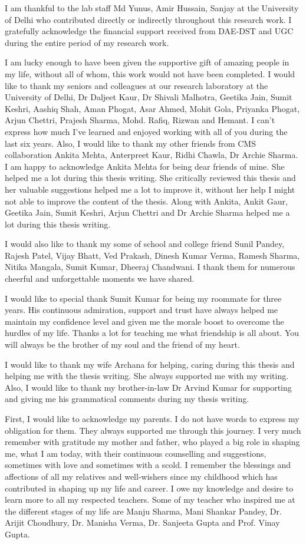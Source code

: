 I am thankful to the lab staff Md Yunus, Amir Hussain, Sanjay at the University of Delhi who contributed directly or indirectly throughout this research work. I gratefully acknowledge the financial support received from DAE-DST and UGC during the entire period of my research work.

I am lucky enough to have been given the supportive gift of amazing people in my life, without all of whom, this work would not have been completed. I would like to thank my seniors and colleagues at our research laboratory at the University of Delhi, Dr Daljeet Kaur, Dr Shivali Malhotra, Geetika Jain, Sumit Keshri, Aashiq Shah, Aman Phogat, Asar Ahmed, Mohit Gola, Priyanka Phogat, Arjun Chettri, Prajesh Sharma, Mohd. Rafiq, Rizwan and Hemant. I can’t express how much I’ve learned and enjoyed working with all of you during the last six years. Also, I would like to thank my other friends from CMS collaboration Ankita Mehta, Anterpreet Kaur, Ridhi Chawla, Dr Archie Sharma.
I am happy to acknowledge Ankita Mehta for being dear friends of mine. She helped me a lot during this thesis writing. She critically reviewed this thesis and her valuable suggestions helped me a lot to improve it, without her help I might not able to improve the content of the thesis. Along with Ankita, Ankit Gaur, Geetika Jain, Sumit Keshri, Arjun Chettri and Dr Archie Sharma helped me a lot during this thesis writing.

I would also like to thank my some of school and college friend Sunil Pandey, Rajesh Patel, Vijay Bhatt, Ved Prakash, Dinesh Kumar Verma, Ramesh Sharma, Nitika Mangala, Sumit Kumar, Dheeraj Chandwani. I thank them for numerous cheerful and unforgettable moments we have shared. 

I would like to special thank Sumit Kumar for being my roommate for three years. His continuous admiration, support and trust have always helped me maintain my confidence level and given me the morale boost to overcome the hurdles of my life. Thanks a lot for teaching me what friendship is all about. You will always be the brother of my soul and the friend of my heart.

I would like to thank my wife Archana for helping, caring during this thesis and helping me with the thesis writing. She always supported me with my writing. Also, I would like to thank my brother-in-law Dr Arvind Kumar for supporting and giving me his grammatical comments during my thesis writing.


First, I would like to acknowledge my parents. I do not have words to express my obligation for them. They always supported me through this journey. I very much remember with gratitude my mother and father, who played a big role in shaping me, what I am today, with their continuous counselling and suggestions, sometimes with love and sometimes with a scold. I remember the blessings and affections of all my relatives and well-wishers since my childhood which has contributed in shaping up my life and career. I owe my knowledge and desire to learn more to all my respected teachers. Some of my teacher who inspired me at the different stages of my life are Manju Sharma, Mani Shankar Pandey, Dr. Arijit Choudhury, Dr. Manisha Verma, Dr. Sanjeeta Gupta and Prof. Vinay Gupta.

